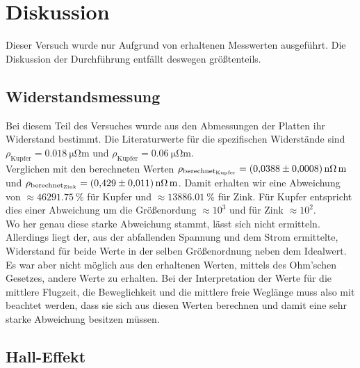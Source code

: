 \section{Diskussion}
Dieser Versuch wurde nur Aufgrund von erhaltenen Messwerten ausgeführt. Die Diskussion der Durchführung entfällt deswegen größtenteils.
\subsection{Widerstandsmessung}
Bei diesem Teil des Versuches wurde aus den Abmessungen der Platten ihr Widerstand bestimmt. Die Literaturwerte für die spezifischen Widerstände \cite{Widerstand}
sind $\rho_\text{Kupfer}=\SI{0.018}{\micro\ohm\metre}$ und $\rho_\text{Kupfer}=\SI{0.06}{\micro\ohm\metre}$.\\
Verglichen mit den berechneten Werten $\rho_\text{berechnet$_\text{Kupfer}$} = \SI{0.0388+-0.0008}{\nano\ohm\meter}$ und 
$\rho_\text{berechnet$_\text{Zink}$} = \SI{0.429+-0.011}{\nano\ohm\meter}$. Damit erhalten wir eine Abweichung von $\approx \SI{46291.75}{\percent}$ für Kupfer und 
$\approx \SI{13886.01}{\percent}$ für Zink. Für Kupfer entspricht dies einer Abweichung um die Größenordung $\approx 10^3$ und für Zink $\approx 10^2$.\\
Wo her genau diese starke Abweichung stammt, lässt sich nicht ermitteln.\\
Allerdings liegt der, aus der abfallenden Spannung und dem Strom ermittelte, Widerstand für beide Werte in der selben Größenordnung neben dem Idealwert.
Es war aber nicht möglich aus den erhaltenen Werten, mittels des Ohm'schen Gesetzes, andere Werte zu erhalten.  
Bei der Interpretation der Werte für die mittlere Flugzeit, die Beweglichkeit und die mittlere freie Weglänge muss also mit beachtet werden, dass sie sich aus diesen Werten berechnen und damit 
eine sehr starke Abweichung besitzen müssen.

\subsection{Hall-Effekt}

